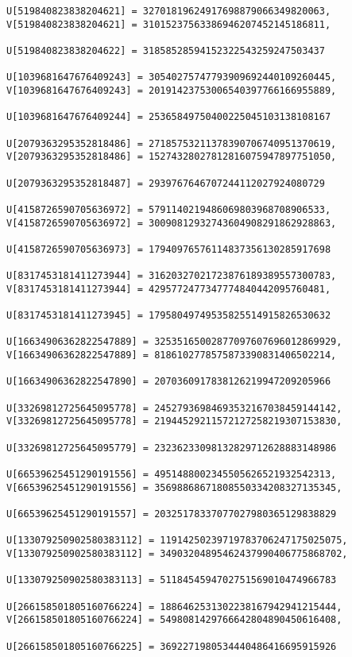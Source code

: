 \documentclass[a4paper]{article}
\begin{document}
\begin{verbatim}
U[519840823838204621] = 32701819624917698879066349820063, 
V[519840823838204621] = 31015237563386946207452145186811, 

U[519840823838204622] = 31858528594152322543259247503437

U[1039681647676409243] = 30540275747793909692440109260445, 
V[1039681647676409243] = 20191423753006540397766166955889, 

U[1039681647676409244] = 25365849750400225045103138108167

U[2079363295352818486] = 27185753211378390706740951370619, 
V[2079363295352818486] = 15274328027812816075947897751050, 

U[2079363295352818487] = 2939767646707244112027924080729

U[4158726590705636972] = 5791140219486069803968708906533, 
V[4158726590705636972] = 30090812932743604908291862928863, 

U[4158726590705636973] = 17940976576114837356130285917698

U[8317453181411273944] = 31620327021723876189389557300783, 
V[8317453181411273944] = 4295772477347774840442095760481, 

U[8317453181411273945] = 17958049749535825514915826530632

U[16634906362822547889] = 32535165002877097607696012869929, 
V[16634906362822547889] = 8186102778575873390831406502214, 

U[16634906362822547890] = 2070360917838126219947209205966

U[33269812725645095778] = 24527936984693532167038459144142, 
V[33269812725645095778] = 21944529211572127258219307153830, 

U[33269812725645095779] = 23236233098132829712628883148986

U[66539625451290191556] = 4951488002345505626521932542313, 
V[66539625451290191556] = 35698868671808550334208327135345, 

U[66539625451290191557] = 20325178337077027980365129838829

U[133079250902580383112] = 11914250239719783706247175025075, 
V[133079250902580383112] = 34903204895462437990406775868702, 

U[133079250902580383113] = 5118454594702751569010474966783

U[266158501805160766224] = 1886462531302238167942941215444, 
V[266158501805160766224] = 5498081429766642804890450616408, 

U[266158501805160766225] = 3692271980534440486416695915926


\end{verbatim}
\end{document}
